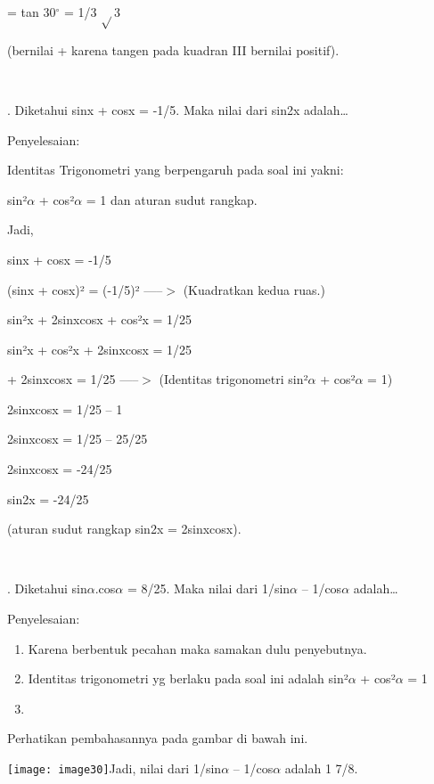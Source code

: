 \documentclass[11pt,fleqn]{book} %
\begin{document}
\noindent = tan 30${}^\circ$ = 1/3 $\mathrm{\sqrt{}}$3

\noindent (bernilai + karena tangen pada kuadran III bernilai positif).

\noindent ~

. Diketahui sinx + cosx = -1/5. Maka nilai dari sin2x adalah{\dots}

\noindent Penyelesaian:

\noindent Identitas Trigonometri yang berpengaruh pada soal ini yakni:

\noindent sin²$\alpha$ + cos²$\alpha$ = 1 dan aturan sudut rangkap.

\noindent Jadi,

\noindent sinx + cosx = -1/5

\noindent (sinx + cosx)² = (-1/5)² -----$>$ (Kuadratkan kedua ruas.)

\noindent sin²x + 2sinxcosx + cos²x = 1/25

\noindent sin²x + cos²x + 2sinxcosx = 1/25

 + 2sinxcosx = 1/25 -----$>$ (Identitas trigonometri sin²$\alpha$ + cos²$\alpha$ = 1)

\noindent 2sinxcosx = 1/25 -- 1

\noindent 2sinxcosx = 1/25 -- 25/25

\noindent 2sinxcosx = -24/25

\noindent sin2x = -24/25

\noindent (aturan sudut rangkap sin2x = 2sinxcosx).

\noindent ~

. Diketahui sin$\alpha$.cos$\alpha$ = 8/25. Maka nilai dari 1/sin$\alpha$ -- 1/cos$\alpha$ adalah{\dots}

\noindent Penyelesaian:

\begin{enumerate}
\item  Karena berbentuk pecahan maka samakan dulu penyebutnya.

\item  Identitas trigonometri yg berlaku pada soal ini adalah sin²$\alpha$ + cos²$\alpha$ = 1

\item  
\end{enumerate}

\noindent Perhatikan pembahasannya pada gambar di bawah ini.

\noindent \texttt{[image: image30]}Jadi, nilai dari 1/sin$\alpha$ -- 1/cos$\alpha$ adalah 1 7/8.
\end{document}
